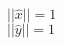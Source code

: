 \documentclass[preview]{standalone}
\begin{document}
\begin{center}
$||\hat{x}||= 1$\\$||\hat{y}||= 1$
\end{center}
\end{document}
